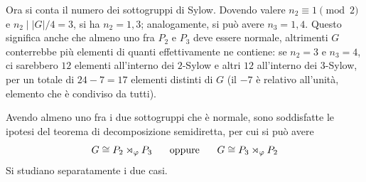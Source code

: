 \documentclass[11pt]{article}
\theoremstyle{style}
\numberwithin{equation}{subsection}
\begin{document}
	Ora si conta il numero dei sottogruppi di Sylow.
	Dovendo valere $n_2\equiv 1 \pmod{2} $ e $n_2  \mid |G| / 4 = 3$, si ha $n_2 = 1, 3$; analogamente, si pu\`o avere $n_3 = 1,4$.
	Questo significa anche che almeno uno fra $P_2$ e $ P_3$ deve essere normale, altrimenti $G$ conterrebbe pi\`u elementi di quanti effettivamente ne contiene: se $n_2 = 3$ e $n_3=4$, ci sarebbero $12$ elementi all'interno dei $2$-Sylow e altri $12$ all'interno dei $3$-Sylow, per un totale di $24-7 = 17$ elementi distinti di $G$ (il $-7$ \`e relativo all'unit\`a, elemento che \`e condiviso da tutti).

	Avendo almeno uno fra i due sottogruppi che \`e normale, sono soddisfatte le ipotesi del teorema di decomposizione semidiretta, per cui si pu\`o avere
	\[
	G\cong P_2 \rtimes _\varphi P_3 \hspace{.5cm} \text{ oppure }\hspace{.5cm}G\cong P_3 \rtimes _\varphi P_2
	\] 
	Si studiano separatamente i due casi.
\end{document}
